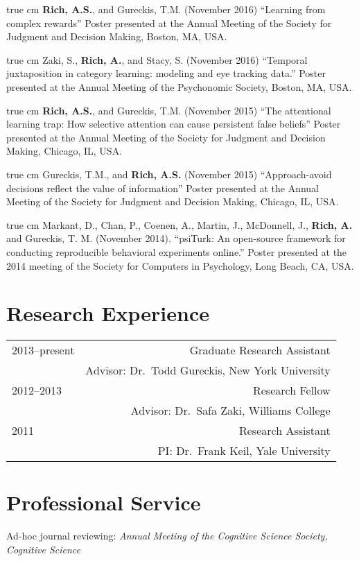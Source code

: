 \documentclass[12pt]{my_cv}
\def\ind{\hangindent=1 true cm\hangafter=1 \noindent}
\begin{document}
\ind \textbf{Rich, A.S.}, and Gureckis, T.M. (November 2016) ``Learning from
complex rewards'' Poster presented at the Annual Meeting of the Society for
Judgment and Decision Making, Boston, MA, USA.

\ind Zaki, S., \textbf{Rich, A.}, and Stacy, S. (November 2016)
``Temporal juxtaposition in category learning: modeling and eye tracking data.''
Poster presented at the Annual Meeting of the Psychonomic Society, Boston, MA, USA.

\ind \textbf{Rich, A.S.}, and Gureckis, T.M. (November 2015) ``The attentional
learning trap: How selective attention can cause persistent false beliefs''
Poster presented at the Annual Meeting of the Society for Judgment and Decision
Making, Chicago, IL, USA.

\ind Gureckis, T.M., and \textbf{Rich, A.S.} (November 2015) ``Approach-avoid
decisions reflect the value of information'' Poster presented at the Annual
Meeting of the Society for Judgment and Decision Making, Chicago, IL, USA.

\ind Markant, D., Chan, P., Coenen, A., Martin, J., McDonnell, J., \textbf{Rich,
  A.} and Gureckis, T. M. (November 2014). ``psiTurk: An open-source framework
for conducting reproducible behavioral experiments online.'' Poster presented at
the 2014 meeting of the Society for Computers in Psychology, Long Beach, CA,
USA.

\section{Research Experience}
\begin{tabular}{L R}
2013--present& Graduate Research Assistant\\
&Advisor: Dr.\ Todd Gureckis, New York University\\[1ex]
2012--2013& Research Fellow\\
&Advisor: Dr.\ Safa Zaki, Williams College\\[1ex]
2011&Research Assistant\\
&PI: Dr.\ Frank Keil, Yale University\\
\end{tabular}

\section{Professional Service}

Ad-hoc journal reviewing: \emph{Annual Meeting of the Cognitive Science Society,
Cognitive Science}
\end{document}
